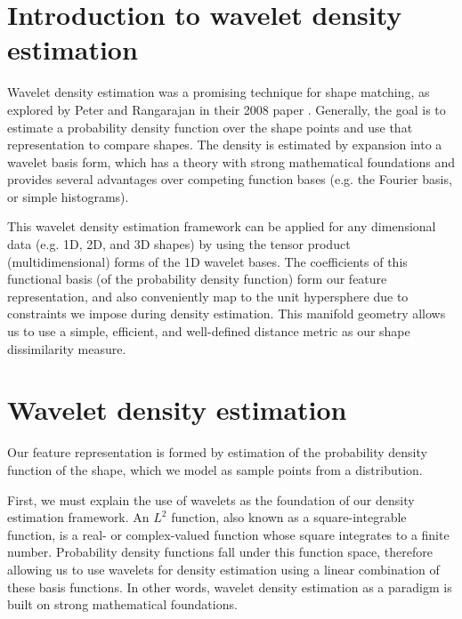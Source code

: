 \documentclass[../tech_report_1.tex]{subfiles}
\begin{document}
\section{Introduction to wavelet density estimation}

Wavelet density estimation was a promising technique for shape matching, as explored by Peter and Rangarajan in their 2008 paper \cite{peter2008maximum}. Generally, the goal is to estimate a probability density function over the shape points and use that representation to compare shapes. The density is estimated by expansion into a wavelet basis form, which has a theory with strong mathematical foundations and provides several advantages over competing function bases (e.g. the Fourier basis, or simple histograms). 

This wavelet density estimation framework can be applied for any dimensional data (e.g. 1D, 2D, and 3D shapes) by using the tensor product (multidimensional) forms of the 1D wavelet bases. The coefficients of this functional basis (of the probability density function) form our feature representation, and also conveniently map to the unit hypersphere due to constraints we impose during density estimation. This manifold geometry allows us to use a simple, efficient, and well-defined distance metric as our shape dissimilarity measure.




\section{Wavelet density estimation}

Our feature representation is formed by estimation of the probability density function of the shape, which we model as sample points from a distribution. 

First, we must explain the use of wavelets as the foundation of our density estimation framework. An $L^{2}$ function, also known as a square-integrable function, is a real- or complex-valued function whose square integrates to a finite number. Probability density functions fall
under this function space, therefore allowing us to use wavelets for
density estimation using a linear combination of these basis functions. In other words, wavelet density estimation  as a paradigm is built on strong mathematical foundations.
\end{document}
